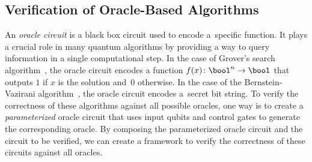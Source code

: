 \vspace{-0.0mm}
\subsection{Verification of Oracle-Based Algorithms}\label{sec:oracle}
\vspace{-0.0mm}

\figBVcircuit  %

An \emph{oracle circuit} is a black box circuit used to encode a~specific
function. It plays a crucial role in many quantum algorithms by providing a way
to query information in a single computational step. In the case of Grover's
search algorithm~\cite{Grover96}, the oracle circuit encodes a function
$f(x)\colon \bool^n \to \bool$ that outputs $1$ if $x$ is the solution
and~$0$ otherwise. In the case of the Bernstein-Vazirani
algorithm~\cite{BernsteinV93}, the oracle circuit encodes a~secret bit string.
To verify the correctness of these algorithms against all possible oracles, one
way is to create a \emph{parameterized} oracle circuit that uses input qubits
and control gates to generate the corresponding oracle.
By composing the parameterized oracle circuit and the circuit to be verified, we
can create a framework to verify the correctness of these circuits against
all oracles.

